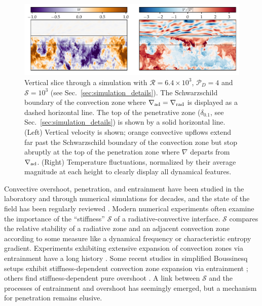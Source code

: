 \documentclass[twocolumn]{aastex631}
\newcommand{\gradrad}{\ensuremath{\nabla_{\rm{rad}}}}
\newcommand{\gradad}{\ensuremath{\nabla_{\rm{ad}}}}
\newcommand{\justgrad}{\ensuremath{\nabla}}
\newcommand{\mP}{\ensuremath{\mathcal{P}}}
\newcommand{\mR}{\ensuremath{\mathcal{R}}}
\newcommand{\mS}{\ensuremath{\mathcal{S}}}
\begin{document}
\begin{figure}[t]
\centering
\includegraphics[width=\textwidth]{vertical_dynamics_panels.pdf}
\caption{
Vertical slice through a simulation with $\mR = 6.4 \times 10^3$, $\mP_D = 4$ and $\mS = 10^3$ (see Sec.~\ref{sec:simulation_details}).
The Schwarzschild boundary of the convection zone where $\gradad = \gradrad$ is displayed as a dashed horizontal line.
The top of the penetrative zone ($\delta_{0.1}$, see Sec.~\ref{sec:simulation_details}) is shown by a solid horizontal line.
(Left) Vertical velocity is shown; orange convective upflows extend far past the Schwarzschild boundary of the convection zone but stop abruptly at the top of the penetration zone where $\justgrad$ departs from $\gradad$.
(Right) Temperature fluctuations, normalized by their average magnitude at each height to clearly display all dynamical features.
\label{fig:vertical_dynamics_panels}
}
\end{figure}



Convective overshoot, penetration, and entrainment have been studied in the laboratory and through numerical simulations for decades, and the state of the field has been regularly reviewed \citep[e.g.,][]{marcus_etal_1983, zahn1991, browning_etal_2004, rogers_etal_2006, viallet_etal_2015, korre_etal_2019}.
Modern numerical experiments often examine the importance of the ``stiffness'' $\mS$ of a radiative-convective interface.
$\mS$ compares the relative stability of a radiative zone and an adjacent convection zone according to some measure like a dynamical frequency or characteristic entropy gradient.
Experiments exhibiting extensive expansion of convection zones via entrainment have a long history \citep[dating back to e.g.,][and this process is often confusingly called ``penetration'']{musman1968, deardorff_etal_1969, moore_weiss_1973}.
Some recent studies in simplified Boussinesq setups exhibit stiffness-dependent convection zone expansion via entrainment \citep{couston_etal_2017, toppaladoddi_wettlaufer_2018}; others find stiffness-dependent pure overshoot \citep{korre_etal_2019}.
A link between $\mS$ and the processes of entrainment and overshoot has seemingly emerged, but a mechanism for penetration remains elusive.
\end{document}
